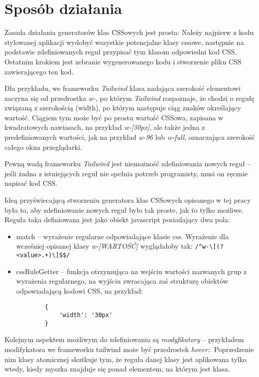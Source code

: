 \documentclass{SGGW-thesis}
\begin{document}
\section{Sposób działania}
Zasada działania generatorów klas CSSowych jest prosta: Należy najpierw z kodu stylowanej aplikacji wydobyć wszystkie potencjalne klasy cssowe, następnie na podstawie zdefiniowanych reguł przypisać tym klasom odpowiedni kod CSS. Ostatnim krokiem jest zebranie wygenerowanego kodu i stworzenie pliku CSS zawierającego ten kod.

Dla przykładu, we frameworku \emph{Tailwind} klasa nadająca szerokość elementowi zaczyna się od przedrostka \emph{w-}, po którym \emph{Tailwind} rozpoznaje, że chodzi o regułę związaną z szerokością (width), po którym następuje ciąg znaków określający wartość. Ciągiem tym może być po prostu wartość CSSowa, zapisana w kwadratowych nawiasach, na przykład \emph{w-[30px]}, ale także jedna z predefiniowanych wartości, jak na przykład \emph{w-96} lub \emph{w-full}, oznaczająca szerokość całego okna przeglądarki.

Pewną wadą frameworku \emph{Tailwind} jest niemożność zdefiniowania nowych reguł -- jeśli żadna z istniejących reguł nie spełnia potrzeb programisty, musi on ręcznie napisać kod CSS.

Ideą przyświecającą stworzeniu generatora klas CSSowych opisanego w tej pracy było to, aby zdefiniowanie nowych reguł było tak proste, jak to tylko możliwe. Reguła taka definiowana jest jako obiekt javascript posiadający dwa pola:
\begin{itemize}
    \item match -- wyrażenie regularne odpowiadające klasie css. Wyrażenie dla wcześniej opisanej klasy \emph{w-[WARTOŚĆ]} wyglądałoby tak: \verb|/^w-\[(?<value>.+)\]$$/|
    \item cssRuleGetter -- funkcja otrzymująca na wejściu wartości nazwanych grup z wyrażenia regularnego, na wyjściu zwracająca zaś strukturę obiektów odpowiadającą kodowi CSS, na przykład:
    \begin{verbatim}
        {
            'width': '30px'
        }
    \end{verbatim}
\end{itemize}

Kolejnym aspektem możliwym do zdefiniowania są \emph{modyfikatory} -- przykładem modifykatora we frameworku tailwind może być przedrostek \emph{hover:}. Poprzedzenie nim klasy atomicznej skutkuje tym, że reguła danej klasy jest aplikowana tylko wtedy, kiedy myszka znajduje się ponad elementem, na którym jest klasa.
\end{document}
